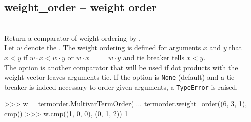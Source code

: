   \subsection{weight\_order -- weight order}
  \\
  \spacing
   \quad Return a comparator of weight ordering by .\\
   \spacing
   \quad Let \(w\) denote the .
   The weight ordering is defined for arguments \(x\) and \(y\) that
   \(x < y\) if \(w\cdot x < w\cdot y\) or \(w\cdot x == w\cdot y\) and 
   tie breaker tells \(x < y\).\\
   \spacing
   \quad The option  is another comparator that will
   be used if dot products with the weight vector leaves arguments tie.
   If the option is {\tt None} (default) and a tie breaker is indeed necessary
   to order given arguments, a {\tt TypeError} is raised.

\begin{ex}
>>> w = termorder.MultivarTermOrder(
...     termorder.weight_order((6, 3, 1), cmp))
>>> w.cmp((1, 0, 0), (0, 1, 2))
1
\end{ex}%
\C



